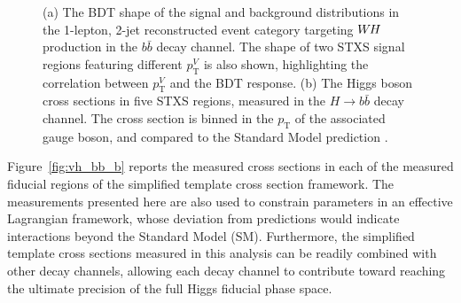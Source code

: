 \documentclass{moriond}
\def\wh{\texorpdfstring{\ensuremath{W\kern -0.1em H}\xspace}{WH\xspace}}
\begin{document}
\begin{figure}[!htbp]
  \centering
  \caption{
    (a) The BDT shape of the signal and background distributions in the 1-lepton, 2-jet
    reconstructed event category targeting \wh production in the $b\bar b$ decay channel. The shape of two STXS signal regions
    featuring different $p^{V}_\mathrm{T}$ is also shown, highlighting the correlation between
    $p^{V}_\mathrm{T}$ and the BDT response.
    (b) The Higgs boson cross sections in five STXS regions, measured in the $H{\rightarrow}b\bar b$ decay channel.
    The cross section is binned in the $p_\mathrm{T}$ of
    the associated gauge boson, and compared to the Standard Model prediction \cite{Aaboud:2019nan}.
  }
  \label{fig:vh_bb}
\end{figure}

Figure~\ref{fig:vh_bb_b} reports the measured cross sections in each of the measured fiducial regions
of the simplified template cross section framework. The measurements presented here are also used
to constrain parameters in an effective Lagrangian framework, whose
deviation from predictions would indicate interactions beyond the Standard Model (SM). Furthermore, the
simplified template cross sections measured in this analysis can be readily combined with other
decay channels, allowing each decay channel to contribute toward reaching the ultimate precision of
the full Higgs fiducial phase space.
\end{document}
